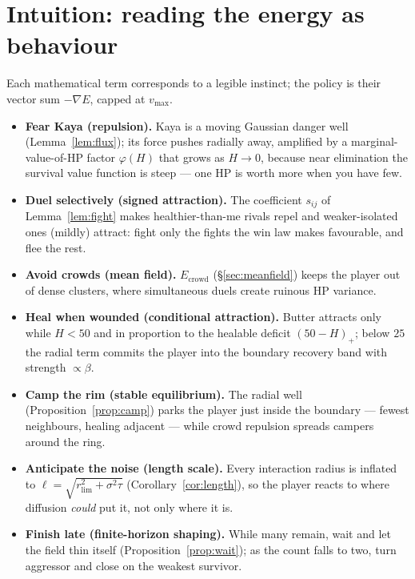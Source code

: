 \documentclass[11pt]{article}
\newcommand{\rlim}{r_{\mathrm{lim}}}
\newcommand{\vmax}{v_{\max}}
\begin{document}
\newpage
\section{Intuition: reading the energy as behaviour}\label{sec:intuition}

Each mathematical term corresponds to a legible instinct; the policy is their
vector sum $-\nabla E$, capped at $\vmax$.

\begin{itemize}[leftmargin=1.5em,itemsep=5pt]
\item \textbf{Fear Kaya (repulsion).} Kaya is a moving Gaussian danger well
(Lemma~\ref{lem:flux}); its force pushes radially away, amplified by a
marginal-value-of-HP factor $\varphi(H)$ that grows as $H\to0$, because near
elimination the survival value function is steep --- one HP is worth more when
you have few.

\item \textbf{Duel selectively (signed attraction).} The coefficient $s_{ij}$
of Lemma~\ref{lem:fight} makes healthier-than-me rivals repel and weaker-isolated
ones (mildly) attract: fight only the fights the win law makes favourable, and
flee the rest.

\item \textbf{Avoid crowds (mean field).} $E_{\mathrm{crowd}}$ (\S\ref{sec:meanfield})
keeps the player out of dense clusters, where simultaneous duels create ruinous
HP variance.

\item \textbf{Heal when wounded (conditional attraction).} Butter attracts only
while $H<50$ and in proportion to the healable deficit $(50-H)_+$; below $25$ the
radial term commits the player into the boundary recovery band with strength
$\propto\beta$.

\item \textbf{Camp the rim (stable equilibrium).} The radial well
(Proposition~\ref{prop:camp}) parks the player just inside the boundary --- fewest
neighbours, healing adjacent --- while crowd repulsion spreads campers around the
ring.

\item \textbf{Anticipate the noise (length scale).} Every interaction radius is
inflated to $\ell=\sqrt{\rlim^2+\sigma^2\tau}$ (Corollary~\ref{cor:length}), so
the player reacts to where diffusion \emph{could} put it, not only where it is.

\item \textbf{Finish late (finite-horizon shaping).} While many remain, wait and
let the field thin itself (Proposition~\ref{prop:wait}); as the count falls to two,
turn aggressor and close on the weakest survivor.
\end{itemize}
\end{document}
